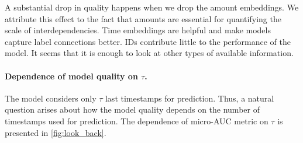 \documentclass[runningheads]{llncs}
\begin{document}
A substantial drop in quality happens when we drop the amount embeddings. We attribute this effect to the fact that amounts are essential for quantifying the scale of interdependencies.
Time embeddings are helpful and make models capture label connections better. 
IDs contribute little to the performance of the model. It seems that it is enough to look at other types of available information. 

\paragraph{\textbf{Dependence of model quality on $\tau$.}}
The model considers only $\tau$ last timestamps for prediction. Thus, a natural question arises about how the model quality depends on the number of timestamps used for prediction. 
The dependence of micro-AUC metric on $\tau$ is presented in \autoref{fig:look_back}.




\end{document}
